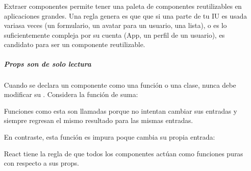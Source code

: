 Extraer componentes permite tener una paleta de componentes reutilizables en
aplicaciones grandes. Una regla genera es que que si una parte de tu IU es
usada variasa veces (un formulario, un avatar para un usuario, una lista),
o es lo suficientemente compleja por su cuenta (App, un perfil de un usuario),
es candidato para ser un componente reutilizable.


\subparagraph{Props son de solo lectura}
\label{\detokenize{reactjs:props-son-de-solo-lectura}}
Cuando se declara un componente como una función o una clase, nunca debe modificar
su . Considera la función de suma:

%
\begin{sphinxVerbatim}[commandchars=\\\{\}]
   
     
\end{sphinxVerbatim}

Funciones como esta son llamadas  porque no intentan cambiar sus entradas
y siempre regresan el mismo resultado para las mismas entradas.

En contraste, esta función es impura poque cambia su propia entrada:

%
\begin{sphinxVerbatim}[commandchars=\\\{\}]
   
    
\end{sphinxVerbatim}

React tiene la regla de que todos los componentes actúan como funciones puras
con respecto a sus props.


